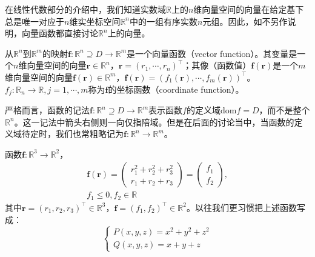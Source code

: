 \documentclass[main.tex]{subfiles}
\begin{document}
在线性代数部分的介绍中，我们知道实数域$\mathbb{R}$上的$n$维向量空间的向量在给定基下总是唯一对应于$n$维实坐标空间$\mathbb{R}^n$中的一组有序实数$n$元组。因此，如不另作说明，向量函数都直接讨论$\mathbb{R}^n$上的向量。

\begin{definition}[向量函数]
从$\mathbb{R}^n$到$\mathbb{R}^m$的映射$\mathbf{f}:\mathbb{R}^n\supseteq D\rightarrow\mathbb{R}^m$是一个向量函数（vector function）。其变量是一个$n$维向量空间的向量$\mathbf{r}\in\mathbb{R}^n$，$\mathbf{r}=\left(r_1,\cdots,r_n\right)^\intercal$；其像（函数值）$\mathbf{f}\left(\mathbf{r}\right)$是一个$m$维向量空间的向量$\mathbf{f}\left(\mathbf{r}\right)\in\mathbb{R}^m$，$\mathbf{f}\left(\mathbf{r}\right)=\left(f_1\left(\mathbf{r}\right),\cdots,f_m\left(\mathbf{r}\right)\right)^\intercal$。$f_j:\mathbb{R}_n\rightarrow\mathbb{R},j=1,\cdots,m$称为$\mathbf{f}$的坐标函数（coordinate function）。
\end{definition}

严格而言，函数的记法$\mathbf{f}:\mathbb{R}^n\supseteq D\rightarrow\mathbb{R}^m$表示函数$f$的定义域$\mathrm{dom}f=D$，而不是整个$\mathbb{R}^n$。这一记法中箭头右侧则一向仅指陪域。但是在后面的讨论当中，当函数的定义域待定时，我们也常粗略记为$\mathbf{f}:\mathbb{R}^n\rightarrow\mathbb{R}^m$。

\begin{example}
函数$\mathbf{f}:\mathbb{R}^3\rightarrow\mathbb{R}^2$，
\[\begin{split}\mathbf{f}\left(\mathbf{r}\right)=\left(\begin{array}{c}r_1^2+r_2^2+r_3^2\\r_1+r_2+r_3\end{array}\right)=\left(\begin{array}{c}f_1\\f_2\end{array}\right),\\f_1\leq0,f_2\in\mathbb{R}\end{split}\]
其中$\mathbf{r}=\left(r_1,r_2,r_3\right)^\intercal\in\mathbb{R}^3$，$\mathbf{f}=\left(f_1,f_2\right)^\intercal\in\mathbb{R}^2$。以往我们更习惯把上述函数写成：
\[
\left\{\begin{array}{l}
    P\left(x,y,z\right)=x^2+y^2+z^2\\
    Q\left(x,y,z\right)=x+y+z
\end{array}
\right.
\]
\end{example}
\end{document}
